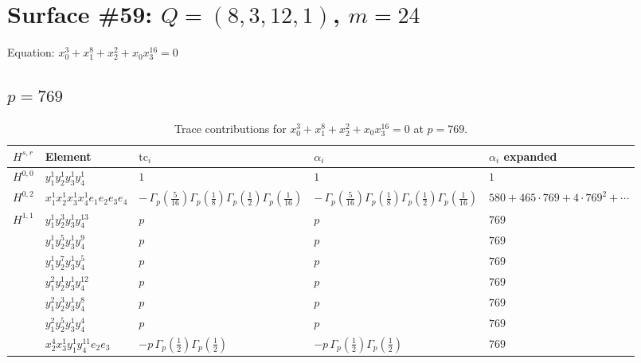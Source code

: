 \documentclass[11pt]{article}
\begin{document}
\newpage

\section*{Surface \#59: $Q=(8, 3, 12, 1)$, $m=24$}

Equation: $x_0^{3} + x_1^{8} + x_2^{2} + x_0 x_3^{16} = 0$

\subsection*{$p = 769$}

\begin{table}[ht]
\centering
\caption{Trace contributions for $x_0^{3} + x_1^{8} + x_2^{2} + x_0 x_3^{16} = 0$ at $p=769$.}\label{tab:deformed-59}
\renewcommand{\arraystretch}{1.1}
{\scriptsize
\begin{tabular}{@{}lllll@{}}
\toprule
$H^{s,r}$ & Element & $\mathrm{tc}_i$ & $\alpha_i$ & $\alpha_i$ expanded \\
\midrule
$H^{0,0}$ & $y_{1}^{1} y_{2}^{1} y_{3}^{1} y_{4}^{1}$ & $1$ & $1$ & $1$ \\
\midrule
$H^{0,2}$ & $x_{1}^{1} x_{2}^{1} x_{3}^{1} x_{4}^{1}  e_{1} e_{2} e_{3} e_{4}$ & $- \, \Gamma_p \left( \frac{5}{16} \right) \Gamma_p \left( \frac{1}{8} \right) \Gamma_p \left( \frac{1}{2} \right) \Gamma_p \left( \frac{1}{16} \right)$ & $- \, \Gamma_p \left( \frac{5}{16} \right) \Gamma_p \left( \frac{1}{8} \right) \Gamma_p \left( \frac{1}{2} \right) \Gamma_p \left( \frac{1}{16} \right)$ & $580{+}465{\cdot}769{+}4{\cdot}769^{2}{+}\cdots$ \\
\midrule
$H^{1,1}$ & $y_{1}^{1} y_{2}^{3} y_{3}^{1} y_{4}^{13}$ & $p \,$ & $p \,$ & $769$ \\
 & $y_{1}^{1} y_{2}^{5} y_{3}^{1} y_{4}^{9}$ & $p \,$ & $p \,$ & $769$ \\
 & $y_{1}^{1} y_{2}^{7} y_{3}^{1} y_{4}^{5}$ & $p \,$ & $p \,$ & $769$ \\
 & $y_{1}^{2} y_{2}^{1} y_{3}^{1} y_{4}^{12}$ & $p \,$ & $p \,$ & $769$ \\
 & $y_{1}^{2} y_{2}^{3} y_{3}^{1} y_{4}^{8}$ & $p \,$ & $p \,$ & $769$ \\
 & $y_{1}^{2} y_{2}^{5} y_{3}^{1} y_{4}^{4}$ & $p \,$ & $p \,$ & $769$ \\
 & $x_{2}^{4} x_{3}^{1} y_{1}^{1} y_{4}^{11} e_{2} e_{3}$ & $- p \, \Gamma_p \left( \frac{1}{2} \right) \Gamma_p \left( \frac{1}{2} \right)$ & $- p \, \Gamma_p \left( \frac{1}{2} \right) \Gamma_p \left( \frac{1}{2} \right)$ & $769$ \\

\end{tabular}}
\end{table}
\end{document}
